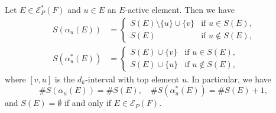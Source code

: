 \documentclass[ALCO,ThmDefs,Unicode,epreuves]{cedram}
\newcommand\EE{\mathcal{E}}
\begin{document}
\begin{lemm}
\label{lem:SE1}
Let $E \in \EE^*_P(F)$ and $u \in E$ an $E$-active element.
Then we have
\begin{align}
\label{eq:SE11}
S(\alpha_u(E))
 &=
\begin{cases}
 S(E) \setminus \{ u \} \cup \{ v \} &\text{if $u \in S(E)$,} \\
 S(E) &\text{if $u \not\in S(E)$,}
\end{cases}
\\
\label{eq:SE12}
S(\alpha^*_u(E))
 &=
\begin{cases}
 S(E) \cup \{ v \} &\text{if $u \in S(E)$,} \\
 S(E) \cup \{ u \} &\text{if $u \not\in S(E)$,}
\end{cases}
\end{align}
where $[v,u]$ is the $d_k$-interval with top element $u$.
In particular, we have
$$
\# S(\alpha_u(E)) = \# S(E),
\quad
\# S(\alpha^*_u(E)) = \# S(E) + 1,
$$
and $S(E) = \emptyset$ if and only if $E \in \EE_P(F)$.
\end{lemm}
\end{document}
